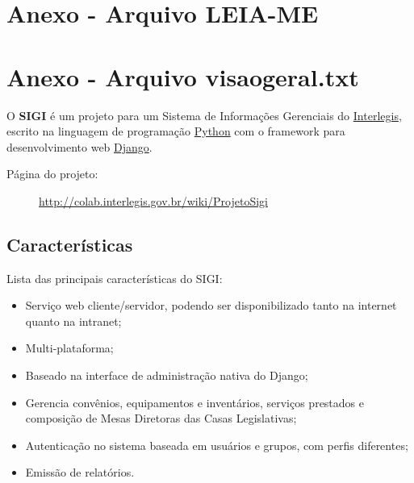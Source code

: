 %
%

\section{Anexo - Arquivo LEIA-ME}
\label{sec:a1}


\section{Anexo - Arquivo visaogeral.txt}
\label{sec:a2}
O \textbf{SIGI} é um projeto para um Sistema de Informações Gerenciais do
\href{http://www.interlegis.gov.br/}{Interlegis}, escrito na linguagem de
programação \href{http://www.python.org}{Python} com o framework para
desenvolvimento web \href{http://www.djangoproject.org}{Django}.
\begin{description}
\item[{Página do projeto}:] %

\href{http://colab.interlegis.gov.br/wiki/ProjetoSigi}{http://colab.interlegis.gov.br/wiki/ProjetoSigi}

\end{description}



\hypertarget{caracter-sticas}{}
\subsection*{Características}

Lista das principais características do SIGI:
\begin{itemize}
\item {} 
Serviço web cliente/servidor, podendo ser disponibilizado tanto na
internet quanto na intranet;

\item {} 
Multi-plataforma;

\item {} 
Baseado na interface de administração nativa do Django;

\item {} 
Gerencia convênios, equipamentos e inventários, serviços prestados e
composição de Mesas Diretoras das Casas Legislativas;

\item {} 
Autenticação no sistema baseada em usuários e grupos, com perfis
diferentes;

\item {} 
Emissão de relatórios.

\end{itemize}


